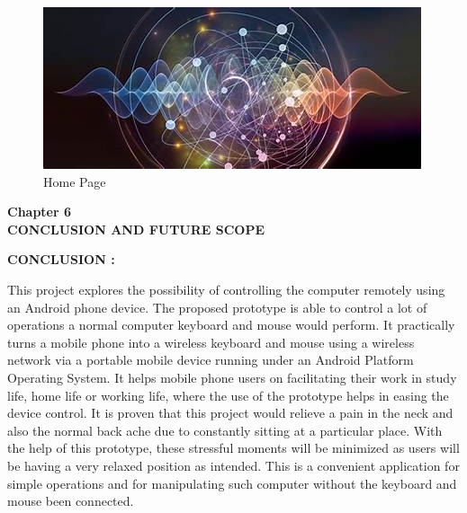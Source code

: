 \documentclass[12pt]{article}
\begin{document}
 \begin{figure}[h]
 \centering
 \includegraphics[scale=1]{Quantum}
  \caption{Home Page}
 \end{figure}
 
\clearpage

\begin{center}
 \LARGE \textbf {Chapter 6 }\\[10mm]
 \Large \textbf{CONCLUSION AND FUTURE SCOPE }\\[10mm]
 \end{center}
 \large \textbf{CONCLUSION :}\\[3mm]\par

This project explores the possibility of controlling the computer remotely using
an Android phone device. The proposed prototype is able to control a lot of
operations a normal computer keyboard and mouse would perform. It
practically turns a mobile phone into a wireless keyboard and mouse using a
wireless network via a portable mobile device running under an Android
Platform Operating System. It helps mobile phone users on facilitating their
work in study life, home life or working life, where the use of the prototype
helps in easing the device control. It is proven that this project would relieve a
pain in the neck and also the normal back ache due to constantly sitting at a
particular place. With the help of this prototype, these stressful moments will
be minimized as users will be having a very relaxed position as intended. This is
a convenient application for simple operations and for manipulating such
computer without the keyboard and mouse been connected.
\end{document}
